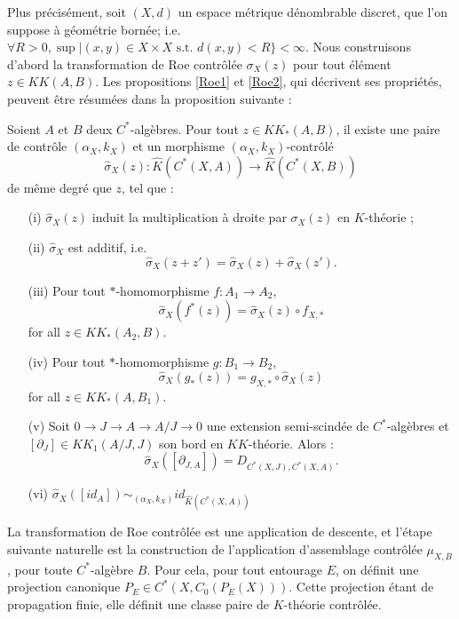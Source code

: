 Plus précisément, soit $(X,d)$ un espace métrique dénombrable discret, que l'on suppose à géométrie bornée; i.e. $\forall R>0,\sup |(x,y) \in X\times X \text{ s.t. }d(x,y)<R\}<\infty$. Nous construisons d'abord la transformation de Roe contrôlée $\sigma_X(z)$ pour tout élément $z\in KK(A,B)$. Les propositions \ref{Roe1} et \ref{Roe2}, qui décrivent ses propriétés, peuvent être résumées dans la proposition suivante :

\begin{prop}
Soient $A$ et $B$ deux $C^*$-algèbres. Pour tout $z\in KK_*(A,B)$, il existe une paire de contrôle $(\alpha_X,k_X)$ et un morphisme $(\alpha_X,k_X)$-contrôlé
\[\hat\sigma_X(z) : \hat K(C^*(X,A))\rightarrow \hat K(C^*(X,B))\]
de même degré que $z$, tel que :
\begin{enumerate}
\item[(i)] $\hat\sigma_X(z)$ induit la multiplication à droite par $\sigma_X(z)$ en $K$-théorie ;
\item[(ii)] $\hat\sigma_X$ est additif, i.e.
\[\hat\sigma_X(z+z')=\hat\sigma_X(z)+\hat\sigma_X(z').\]
\item[(iii)] Pour tout $*$-homomorphisme $f : A_1\rightarrow A_2$,
\[\hat\sigma_X(f^*(z))=\hat\sigma_X(z)\circ f_{X,*}\] for all $z\in KK_*(A_2,B)$.
\item[(iv)] Pour tout $*$-homomorphisme $g : B_1\rightarrow B_2$,
\[\hat\sigma_X(g_*(z))= g_{X,*}\circ \hat\sigma_X(z)\] for all $z\in KK_*(A,B_1)$.
\item[(v)] Soit $0\rightarrow J\rightarrow A\rightarrow A/J\rightarrow 0$ une extension semi-scindée de $C^*$-algèbres et $[\partial_J]\in KK_1(A/J,J)$ son bord en $KK$-théorie. Alors : 
\[\hat\sigma_X([\partial_{J,A}])=D_{C^*(X,J),C^*(X,A)}.\] 
\item[(vi)] $\hat\sigma_X([id_A]) \sim_{(\alpha_X,k_X)} id_{\hat K(C^*(X,A))}$
\end{enumerate}
\end{prop}

La transformation de Roe contrôlée est une application de descente, et l'étape suivante naturelle est la construction de l'application d'assemblage contrôlée $\mu_{X,B}$ , pour toute $C^*$-algèbre $B$. Pour cela, pour tout entourage $E$, on définit une projection canonique $P_E\in C^*(X,C_0(P_E(X)))$. Cette projection étant de propagation finie, elle définit une classe paire de $K$-théorie contrôlée.

